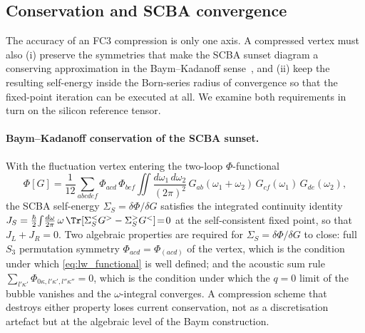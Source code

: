 \subsection{Conservation and SCBA convergence}
\label{sub:scba_conservation}

The accuracy of an FC3 compression is only one axis. A compressed vertex must also
(i) preserve the symmetries that make the SCBA sunset diagram a conserving approximation
in the Baym--Kadanoff sense~\cite{baym_conservation_1961,baym_self-consistent_1962}, and
(ii) keep the resulting self-energy inside the Born-series radius of convergence so that
the fixed-point iteration can be executed at all. We examine both requirements in turn on
the silicon reference tensor.

\paragraph{Baym--Kadanoff conservation of the SCBA sunset.} With the fluctuation vertex
entering the two-loop $\Phi$-functional
\begin{equation}
\Phi[G] = \frac{1}{12}\sum_{abcdef}\Phi_{acd}\,\Phi_{bef}\!
\iint\frac{d\omega_1\,d\omega_2}{(2\pi)^2}\,G_{ab}(\omega_1{+}\omega_2)\,
G_{cf}(\omega_1)\,G_{de}(\omega_2),
\label{eq:lw_functional}
\end{equation}
the SCBA self-energy $\Sigma_S = \delta\Phi/\delta G$ satisfies the integrated continuity
identity $J_S = \tfrac{\hbar}{2}\!\int\!\tfrac{d\omega}{2\pi}\,\omega\,\Tr[\Sigma_S^<G^> -
\Sigma_S^>G^<]\!=\!0$ at the self-consistent fixed point, so that $J_L + J_R = 0$.
Two algebraic properties are required for $\Sigma_S\!=\!\delta\Phi/\delta G$ to close:
full $S_3$ permutation symmetry $\Phi_{acd}\!=\!\Phi_{(acd)}$ of the vertex, which is the
condition under which \cref{eq:lw_functional} is well defined; and the acoustic sum rule
$\sum_{l'\kappa'}\Phi_{0\kappa,l'\kappa',l''\kappa''}=0$, which is the condition under
which the $q\!=\!0$ limit of the bubble vanishes and the $\omega$-integral converges. A
compression scheme that destroys either property loses current conservation, not as a
discretisation artefact but at the algebraic level of the Baym construction.

